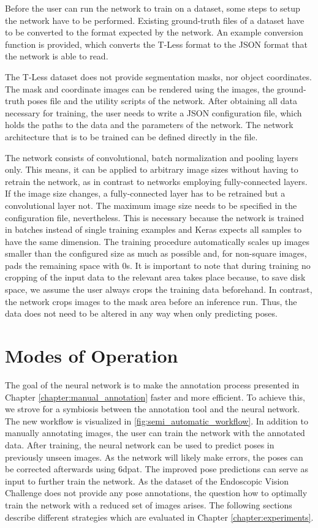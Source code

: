 Before the user can run the network to train on a dataset, some steps to setup the network have to be performed. Existing ground-truth files of a dataset have to be converted to the format expected by the network. An example conversion function is provided, which converts the T-Less format to the JSON format that the network is able to read. 

The T-Less dataset does not provide segmentation masks, nor object coordinates. The mask and coordinate images can be rendered using the images, the ground-truth poses file and the utility scripts of the network. After obtaining all data necessary for training, the user needs to write a JSON configuration file, which holds the paths to the data and the parameters of the network. The network architecture that is to be trained can be defined directly in the file. 

The network consists of convolutional, batch normalization and pooling layers only. This means, it can be applied to arbitrary image sizes without having to retrain the network, as in contrast to networks employing fully-connected layers. If the image size changes, a fully-connected layer has to be retrained but a convolutional layer not. The maximum image size needs to be specified in the configuration file, nevertheless. This is necessary because the network is trained in batches instead of single training examples and Keras expects all samples to have the same dimension. The training procedure automatically scales up images smaller than the configured size as much as possible and, for non-square images, pads the remaining space with 0s. It is important to note that during training no cropping of the input data to the relevant area takes place because, to save disk space, we assume the user always crops the training data beforehand. In contrast, the network crops images to the mask area before an inference run. Thus, the data does not need to be altered in any way when only predicting poses.

\section{Modes of Operation} \label{section:modes_of_operation}

The goal of the neural network is to make the annotation process presented in Chapter \ref{chapter:manual_annotation} faster and more efficient. To achieve this, we strove for a symbiosis between the annotation tool and the neural network. The new workflow is visualized in \fig \ref{fig:semi_automatic_workflow}. In addition to manually annotating images, the user can train the network with the annotated data. After training, the neural network can be used to predict poses in previously unseen images. As the network will likely make errors, the poses can be corrected afterwards using \ac{6dpat}. The improved pose predictions can serve as input to further train the network. As the dataset of the Endoscopic Vision Challenge does not provide any pose annotations, the question how to optimally train the network with a reduced set of images arises. The following sections describe different strategies which are evaluated in Chapter \ref{chapter:experiments}.

